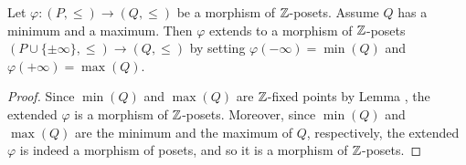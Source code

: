 \begin{lemma}\label{extends}
Let $\varphi\colon (P,\leq)\to (Q,\leq)$ be a morphism of $\mathbb{Z}$-posets. Assume $Q$ has a minimum and a maximum. Then $\varphi$ extends to a morphism of $\mathbb{Z}$-posets $(P\cup\{\pm\infty\},\leq)\to (Q,\leq)$ by setting $\varphi(-\infty)=\min(Q)$ and $\varphi(+\infty)=\max(Q)$.
\end{lemma}
\begin{proof}
Since $\min(Q)$ and $\max(Q)$ are $\mathbb{Z}$-fixed points by Lemma , the extended $\varphi$ is a morphism of $\mathbb{Z}$-posets. Moreover, since $\min(Q)$ and $\max(Q)$ are the minimum and the maximum of $Q$, respectively, the extended $\varphi$ is indeed a morphism of posets, and so it is a morphism of $\mathbb{Z}$-posets.
\end{proof}
